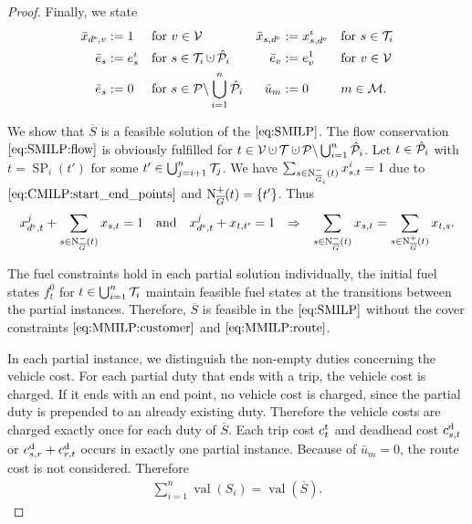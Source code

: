 \begin{proof}
Finally, we state
\begin{align*}
	\bar{x}_{\ds,v} & := 1 && \text{for } v\in\mathcal{V} & \bar{x}_{s,\de} & := x^i_{s,\de} && \text{for } s\in\Ti \\
	\bar{e}_s & := e^i_s && \text{for } s\in\Ti\cupdot\Phat_i & \bar{e}_v & := e^1_v && \text{for } v\in\mathcal{V} \\
	\bar{e}_s & := 0 && \text{for } s\in\mathcal{P}\backslash\Cupdot_{i=1}^n \Phat_i & \bar{u}_m & := 0 && m\in\mathcal{M}. \\
\end{align*}

We show that $\overline{S}$ is a feasible solution of the $\eqref{eq:SMILP}$. The flow conservation $\eqref{eq:SMILP:flow}$ is obviously fulfilled for ${t\in\mathcal{V}\cupdot\mathcal{T}\cupdot\mathcal{P}\backslash\Cupdot_{i=1}^n \Phat_i}$. Let ${t\in\hat{\mathcal{P}}_i}$ with ${t=\operatorname{SP}_i\left(t'\right)}$ for some ${t'\in\bigcup_{j=i+1}^n \mathcal{T}_j}$. We have ${\sum_{s\in\operatorname{N}_{\overline{G}_i}^-(t)} x^i_{s,t} = 1}$ due to $\eqref{eq:CMILP:start_end_points}$ and $\operatorname{N}_{\overline{G}}^+(t) = \left\{t'\right\}$. Thus
\begin{align*}
	x^j_{d^{\operatorname{s}},t} + \sum_{s\in\operatorname{N}_{\overline{G}}^-(t)} x_{s,t} = 1 && \text{and} && x^j_{d^{\operatorname{s}},t} + x_{t,t'} = 1 && \Rightarrow && \sum_{s\in\operatorname{N}_{\overline{G}}^-(t)} x_{s,t} = \sum_{s\in\operatorname{N}_{\overline{G}}^+(t)} x_{t,s}.
\end{align*}

The fuel constraints hold in each partial solution individually, the initial fuel states $f^0_t$ for ${t\in\bigcup_{i=1}^n \mathcal{T}_i}$ maintain feasible fuel states at the transitions between the partial instances. Therefore, $\overline{S}$ is feasible in the $\eqref{eq:SMILP}$ without the cover constraints $\eqref{eq:MMILP:customer}$ and $\eqref{eq:MMILP:route}$.

In each partial instance, we distinguish the non-empty duties concerning the vehicle cost. For each partial duty that ends with a trip, the vehicle cost is charged. If it ends with an end point, no vehicle cost is charged, since the partial duty is prepended to an already existing duty. Therefore the vehicle costs are charged exactly once for each duty of $\overline{S}$. Each trip cost $c^{\operatorname{t}}_t$ and deadhead cost $c^{\operatorname{d}}_{s,t}$ or ${c^{\operatorname{d}}_{s,r}+c^{\operatorname{d}}_{r,t}}$ occurs in exactly one partial instance. Because of ${\bar{u}_m=0}$, the route cost is not considered. Therefore
\begin{align*}
	\sum_{i=1}^n\operatorname{val}\left(S_i\right) = \operatorname{val}\left(\overline{S}\right).
\end{align*}
%
\end{proof}

